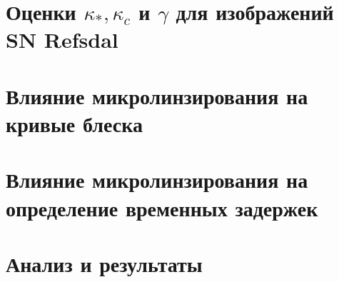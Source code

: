 \section{Оценки $\kappa_*, \kappa_c$ и $\gamma$ для изображений SN Refsdal}
    
    
\section{Влияние микролинзирования на кривые блеска}
    
    
\section{Влияние микролинзирования на определение временных задержек}
    
    
\section{Анализ и результаты}
    